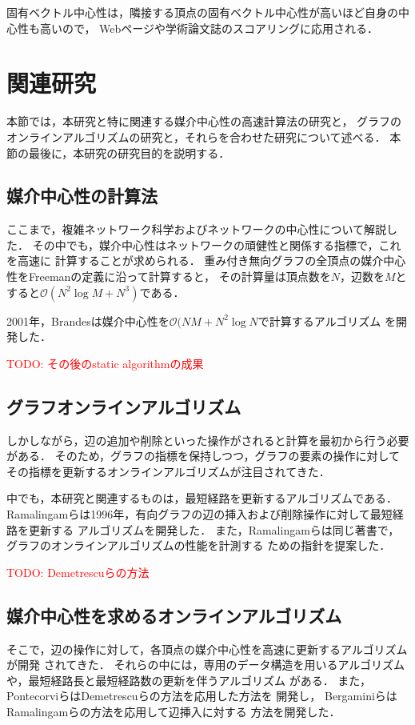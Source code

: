 固有ベクトル中心性は，隣接する頂点の固有ベクトル中心性が高いほど自身の中心性も高いので，
Webページや学術論文誌のスコアリングに応用される．

\section{関連研究}
本節では，本研究と特に関連する媒介中心性の高速計算法の研究と，
グラフのオンラインアルゴリズムの研究と，それらを合わせた研究について述べる．
本節の最後に，本研究の研究目的を説明する．

\subsection{媒介中心性の計算法}
ここまで，複雑ネットワーク科学およびネットワークの中心性について解説した．
その中でも，媒介中心性はネットワークの頑健性と関係する指標で，これを高速に
計算することが求められる．
重み付き無向グラフの全頂点の媒介中心性をFreemanの定義に沿って計算すると，
その計算量は頂点数を$N$，辺数を$M$とすると$\mathcal{O}(N^2\log M+N^3)$である．

2001年，Brandesは媒介中心性を$\mathcal{O}(NM+N^2\log N$で計算するアルゴリズム
\cite{Brandes2001}を開発した．

\textcolor{red}{TODO: その後のstatic algorithmの成果}


\subsection{グラフオンラインアルゴリズム}
しかしながら，辺の追加や削除といった操作がされると計算を最初から行う必要がある．
そのため，グラフの指標を保持しつつ，グラフの要素の操作に対して
その指標を更新するオンラインアルゴリズムが注目されてきた．

中でも，本研究と関連するものは，最短経路を更新するアルゴリズムである．
Ramalingamらは1996年，有向グラフの辺の挿入および削除操作に対して最短経路を更新する
アルゴリズムを開発した\cite{Ramalingam1996}．
また，Ramalingamらは同じ著書で，グラフのオンラインアルゴリズムの性能を計測する
ための指針を提案した．

\textcolor{red}{TODO: Demetrescuらの方法}\cite{Demetrescu2003}

\subsection{媒介中心性を求めるオンラインアルゴリズム}

そこで，辺の操作に対して，各頂点の媒介中心性を高速に更新するアルゴリズムが開発
されてきた．
それらの中には，専用のデータ構造を用いるアルゴリズム\cite{Lee2012,Hayashi2015}
や，最短経路長と最短経路数の更新を伴うアルゴリズム
\cite{Pontecorvi2015,Bergamini2017}がある．
また，PontecorviらはDemetrescuらの方法を応用した方法を
開発し\cite{Pontecorvi2015}，
BergaminiらはRamalingamらの方法を応用して辺挿入に対する
方法を開発した\cite{Bergamini2017}．

